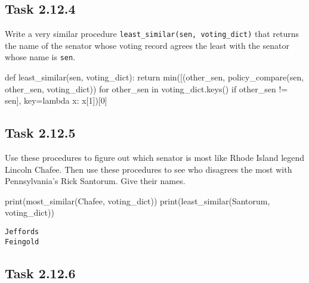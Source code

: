 \documentclass[
  letterpaper,
  DIV=11,
  numbers=noendperiod]{scrartcl}
\newenvironment{Shaded}{\begin{snugshade}}{\end{snugshade}}
\newcommand{\BuiltInTok}[1]{\textcolor[rgb]{0.00,0.23,0.31}{#1}}
\newcommand{\ControlFlowTok}[1]{\textcolor[rgb]{0.00,0.23,0.31}{#1}}
\newcommand{\DecValTok}[1]{\textcolor[rgb]{0.68,0.00,0.00}{#1}}
\newcommand{\KeywordTok}[1]{\textcolor[rgb]{0.00,0.23,0.31}{#1}}
\newcommand{\NormalTok}[1]{\textcolor[rgb]{0.00,0.23,0.31}{#1}}
\newcommand{\OperatorTok}[1]{\textcolor[rgb]{0.37,0.37,0.37}{#1}}
\newcommand{\StringTok}[1]{\textcolor[rgb]{0.13,0.47,0.30}{#1}}
\begin{document}
\hypertarget{task-2.12.4}{%
\subsection{Task 2.12.4}\label{task-2.12.4}}

Write a very similar procedure
\texttt{least\_similar(sen,\ voting\_dict)} that returns the name of the
senator whose voting record agrees the least with the senator whose name
is \texttt{sen}.

\begin{Shaded}
\begin{Highlighting}[numbers=left,,]
\KeywordTok{def}\NormalTok{ least\_similar(sen, voting\_dict): }\ControlFlowTok{return} \BuiltInTok{min}\NormalTok{([(other\_sen, policy\_compare(sen, other\_sen, voting\_dict)) }\ControlFlowTok{for}\NormalTok{ other\_sen }\KeywordTok{in}\NormalTok{ voting\_dict.keys() }\ControlFlowTok{if}\NormalTok{ other\_sen }\OperatorTok{!=}\NormalTok{ sen], key}\OperatorTok{=}\KeywordTok{lambda}\NormalTok{ x: x[}\DecValTok{1}\NormalTok{])[}\DecValTok{0}\NormalTok{]}
\end{Highlighting}
\end{Shaded}

\hypertarget{task-2.12.5}{%
\subsection{Task 2.12.5}\label{task-2.12.5}}

Use these procedures to figure out which senator is most like Rhode
Island legend Lincoln Chafee. Then use these procedures to see who
disagrees the most with Pennsylvania's Rick Santorum. Give their names.

\begin{Shaded}
\begin{Highlighting}[numbers=left,,]
\BuiltInTok{print}\NormalTok{(most\_similar(}\StringTok{\textquotesingle{}Chafee\textquotesingle{}}\NormalTok{, voting\_dict))}
\BuiltInTok{print}\NormalTok{(least\_similar(}\StringTok{\textquotesingle{}Santorum\textquotesingle{}}\NormalTok{, voting\_dict))}
\end{Highlighting}
\end{Shaded}

\begin{verbatim}
Jeffords
Feingold
\end{verbatim}

\hypertarget{task-2.12.6}{%
\subsection{Task 2.12.6}\label{task-2.12.6}}
\end{document}
